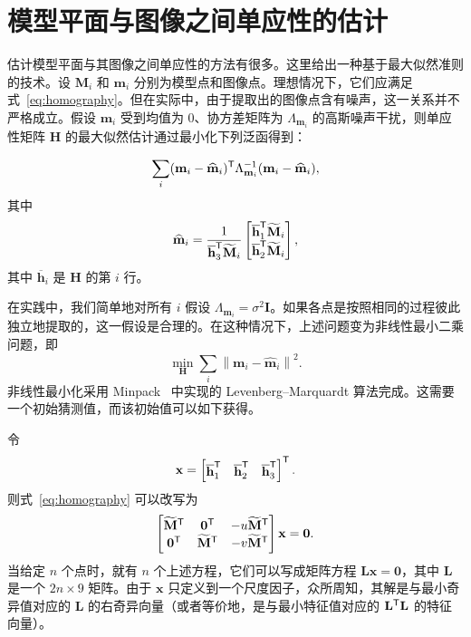 \appendix
\section{模型平面与图像之间单应性的估计}

估计模型平面与其图像之间单应性的方法有很多。这里给出一种基于最大似然准则的技术。设 $\mathbf M_i$ 和 $\mathbf m_i$ 分别为模型点和图像点。理想情况下，它们应满足式~\eqref{eq:homography}。但在实际中，由于提取出的图像点含有噪声，这一关系并不严格成立。假设 $\mathbf m_i$ 受到均值为 0、协方差矩阵为 $\Lambda_{\mathbf m_i}$ 的高斯噪声干扰，则单应性矩阵 $\mathbf H$ 的最大似然估计通过最小化下列泛函得到：

\begin{equation*}
    \sum_i
    (\mathbf m_i-\widehat{\mathbf m}_i)^{\mathsf{T}}
    \Lambda_{\mathbf m_i}^{-1}
    (\mathbf m_i-\widehat{\mathbf m}_i),
\end{equation*}
其中
\begin{equation*}
    \widehat{\mathbf m}_i
    =\frac{1}{\overline{\mathbf h}_3^{\mathsf{T}}\widetilde{\mathbf M}_i}
    \begin{bmatrix}
        \overline{\mathbf h}_1^{\mathsf{T}}\widetilde{\mathbf M}_i\\
        \overline{\mathbf h}_2^{\mathsf{T}}\widetilde{\mathbf M}_i
    \end{bmatrix},
\end{equation*}
其中 $\overline{\mathbf h}_i$ 是 $\mathbf H$ 的第 $i$ 行。

在实践中，我们简单地对所有 $i$ 假设 $\Lambda_{\mathbf m_i}=\sigma^2\mathbf I$。如果各点是按照相同的过程彼此独立地提取的，这一假设是合理的。在这种情况下，上述问题变为非线性最小二乘问题，即
\begin{equation*}
    \min_{\mathbf H}\sum_i
    \left\lVert\mathbf m_i-\widehat{\mathbf m}_i\right\rVert^2.
\end{equation*}
非线性最小化采用 Minpack~\cite{more1977levenberg} 中实现的 Levenberg--Marquardt 算法完成。这需要一个初始猜测值，而该初始值可以如下获得。

令
\begin{equation*}
    \mathbf x=
    \begin{bmatrix}
        \overline{\mathbf h}_1^{\mathsf{T}} &
        \overline{\mathbf h}_2^{\mathsf{T}} &
        \overline{\mathbf h}_3^{\mathsf{T}}
    \end{bmatrix}^{\mathsf{T}}.
\end{equation*}
则式~\eqref{eq:homography} 可以改写为
\begin{equation*}
    \begin{bmatrix}
        \widetilde{\mathbf M}^{\mathsf{T}} & \mathbf 0^{\mathsf{T}} & -u\widetilde{\mathbf M}^{\mathsf{T}}\\
        \mathbf 0^{\mathsf{T}} & \widetilde{\mathbf M}^{\mathsf{T}} & -v\widetilde{\mathbf M}^{\mathsf{T}}
    \end{bmatrix}\mathbf x=\mathbf 0.
\end{equation*}
当给定 $n$ 个点时，就有 $n$ 个上述方程，它们可以写成矩阵方程 $\mathbf L\mathbf x=\mathbf 0$，其中 $\mathbf L$ 是一个 $2n\times9$ 矩阵。由于 $\mathbf x$ 只定义到一个尺度因子，众所周知，其解是与最小奇异值对应的 $\mathbf L$ 的右奇异向量（或者等价地，是与最小特征值对应的 $\mathbf L^{\mathsf{T}}\mathbf L$ 的特征向量）。


